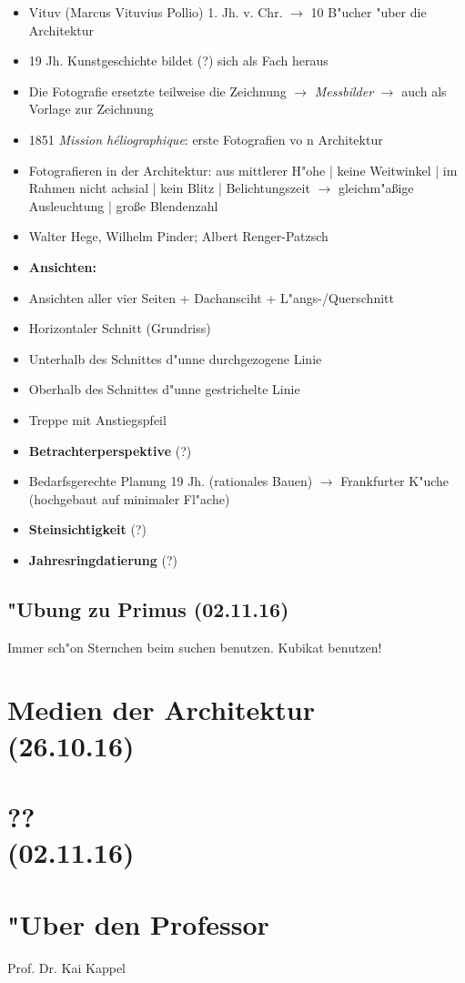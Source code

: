 \documentclass[]{scrartcl}
\begin{document}
\begin{itemize}
  \item Vituv (Marcus Vituvius Pollio) 1. Jh. v. Chr. $\rightarrow$ 10 B"ucher "uber die Architektur
  \item 19 Jh. Kunstgeschichte bildet (?) sich als Fach heraus
  \item Die Fotografie ersetzte teilweise die Zeichnung $\rightarrow$ \emph{Messbilder} $\rightarrow$ auch als Vorlage zur Zeichnung
  \item 1851 \emph{Mission h\'{e}liographique}: erste Fotografien vo n Architektur
  \item Fotografieren in der Architektur: aus mittlerer H"ohe | keine Weitwinkel | im Rahmen nicht achsial | kein Blitz | Belichtungszeit $\rightarrow$ gleichm"a\ss ige Ausleuchtung | gro\ss e Blendenzahl
  \item Walter Hege, Wilhelm Pinder; Albert Renger-Patzsch
  \item \textbf{Ansichten:} 
  \item Ansichten aller vier Seiten + Dachansciht + L"angs-/Querschnitt
  \item Horizontaler Schnitt (Grundriss)
  \item Unterhalb des Schnittes d"unne durchgezogene Linie
  \item Oberhalb des Schnittes d"unne gestrichelte Linie
  \item Treppe mit Anstiegspfeil
  \item \textbf{Betrachterperspektive} {\color{red}(?)}
  \item Bedarfsgerechte Planung 19 Jh. (rationales Bauen) $\rightarrow$ Frankfurter K"uche (hochgebaut auf minimaler Fl"ache)
  \item \textbf{Steinsichtigkeit} {\color{red}(?)}
  \item \textbf{Jahresringdatierung} {\color{red}(?)}
\end{itemize}


\subsection{"Ubung zu Primus (02.11.16)}

Immer sch"on Sternchen beim suchen benutzen.
Kubikat benutzen!

\section{Medien der Architektur\\(26.10.16)}

\section{??\\(02.11.16)}




\newpage
\section{"Uber den Professor}
Prof. Dr. Kai Kappel

\end{document}
